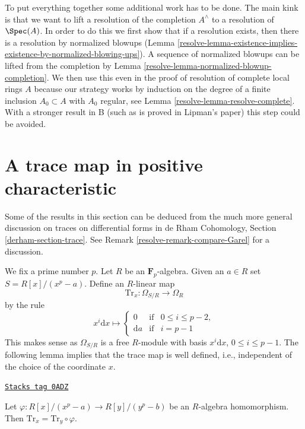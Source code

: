 \medskip\noindent
To put everything together some additional work has
to be done. The main kink is that we want to lift a resolution
of the completion $A^\wedge$ to a resolution of $\Spec(A)$.
In order to do this we first show that if a resolution exists,
then there is a resolution by normalized blowups
(Lemma \ref{resolve-lemma-existence-implies-existence-by-normalized-blowing-ups}).
A sequence of normalized blowups can be lifted from the completion
by Lemma \ref{resolve-lemma-normalized-blowup-completion}.
We then use this even in the proof of resolution of complete
local rings $A$ because our strategy works by induction
on the degree of a finite inclusion $A_0 \subset A$ with
$A_0$ regular, see Lemma \ref{resolve-lemma-resolve-complete}.
With a stronger result in B (such as is proved in Lipman's paper)
this step could be avoided.

\section{A trace map in positive characteristic}
\label{resolve-section-trace}
Some of the results in this section can be deduced from the much more
general discussion on traces on differential forms in
de Rham Cohomology, Section \ref{derham-section-trace}.
See Remark \ref{resolve-remark-compare-Garel} for a discussion.

\medskip\noindent
We fix a prime number $p$. Let $R$ be an $\mathbf{F}_p$-algebra.
Given an $a \in R$ set $S = R[x]/(x^p - a)$. Define an $R$-linear map
$$
\text{Tr}_x : \Omega_{S/R} \longrightarrow \Omega_R
$$
by the rule
$$
x^i\text{d}x \longmapsto
\left\{
\begin{matrix}
0 & \text{if} & 0 \leq i \leq p - 2, \\
\text{d}a & \text{if} & i = p - 1
\end{matrix}
\right.
$$
This makes sense as $\Omega_{S/R}$ is a free $R$-module with
basis $x^i\text{d}x$, $0 \leq i \leq p - 1$.
The following lemma implies that the trace map is well defined,
i.e., independent of the choice of the coordinate $x$.

\begin{lemma}
\label{resolve-lemma-trace-well-defined}
\href{https://stacks.math.columbia.edu/tag/0ADZ}{\texttt{Stacks tag 0ADZ}}

Let $\varphi : R[x]/(x^p - a) \to R[y]/(y^p - b)$ be an $R$-algebra
homomorphism. Then $\text{Tr}_x = \text{Tr}_y \circ \varphi$.
\end{lemma}

